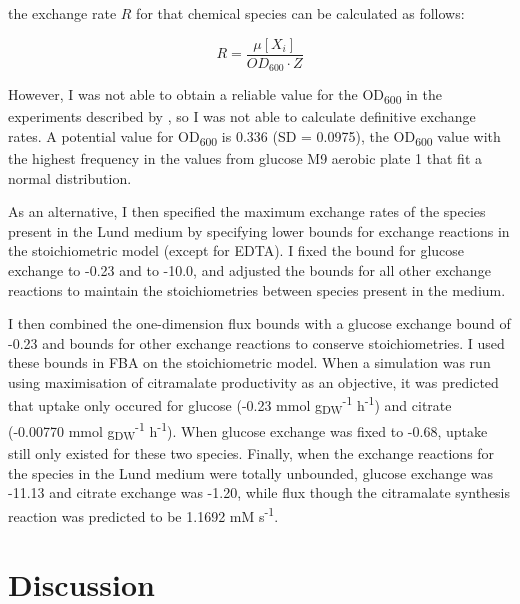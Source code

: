 \documentclass[parskip=full, numbers=noenddot]{scrreprt}
\begin{document}
the exchange rate $R$ for that chemical species can be calculated as follows:

\[
  R = \frac{\mu[X_{i}]}{OD_{600} \cdot Z}
\]

However, I was not able to obtain a reliable value for the OD\textsubscript{600} in the experiments described by \citet{orth_comprehensive_2011}, so I was not able to calculate definitive exchange rates. A potential value for OD\textsubscript{600} is 0.336 (SD = 0.0975), the OD\textsubscript{600} value with the highest frequency in the values from glucose M9 aerobic plate 1 \citep{orth_comprehensive_2011} that fit a normal distribution.

As an alternative, I then specified the maximum exchange rates of the species present in the Lund medium by specifying lower bounds for exchange reactions in the stoichiometric model (except for EDTA).
I fixed the bound for glucose exchange to -0.23 and to -10.0, and adjusted the bounds for all other exchange reactions to maintain the stoichiometries between species present in the medium.

I then combined the one-dimension flux bounds with a glucose exchange bound of -0.23 and bounds for other exchange reactions to conserve stoichiometries. I used these bounds in FBA on the stoichiometric model. When a simulation was run using maximisation of citramalate productivity as an objective, it was predicted that uptake only occured for glucose (-0.23 mmol g\textsubscript{DW}\textsuperscript{-1} h\textsuperscript{-1}) and citrate (-0.00770 mmol g\textsubscript{DW}\textsuperscript{-1} h\textsuperscript{-1}). When glucose exchange was fixed to -0.68, uptake still only existed for these two species. Finally, when the exchange reactions for the species in the Lund medium were totally unbounded, glucose exchange was -11.13 and citrate exchange was -1.20, while flux though the citramalate synthesis reaction was predicted to be 1.1692 mM s\textsuperscript{-1}.


\chapter{Discussion}
\label{ch:discussion}


\end{document}
